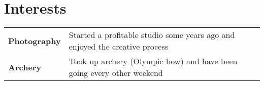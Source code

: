 \documentclass[a4paper,12pt]{article}
\begin{document}
\section{Interests}
\begin{tabularx}{\linewidth}{@{}l X@{}}
\textbf{Photography} &  \normalsize{Started a profitable studio some years ago and enjoyed the creative process}\\
\textbf{Archery}  &  \normalsize{Took up archery (Olympic bow) and have been going every other weekend}\\  
\end{tabularx}

\vfill
{}
\end{document}
